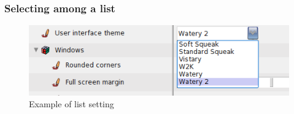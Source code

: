 \documentclass[a4paper,10pt,twoside]{book}
\begin{document}
\subsubsection{Selecting among a list}
\begin{figure}[tbh]
\begin{center}
\includegraphics[scale=0.38]{userInterfaceTheme}
\caption{Example of list setting}
\end{center}
\end{figure}
%
%
%
%
%
\end{document}
